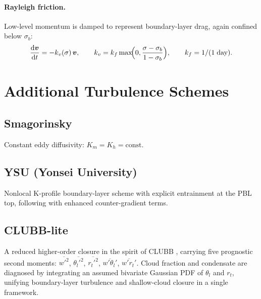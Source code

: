 \documentclass[11pt,twoside]{report}
\newcommand{\dd}{\mathrm{d}}
\newcommand{\vect}[1]{\bm{#1}}
\begin{document}
\paragraph{Rayleigh friction.}
Low-level momentum is damped to represent boundary-layer drag, again confined
below $\sigma_b$:
\begin{equation}
  \frac{\dd\vect{v}}{\dd t} = -k_v(\sigma)\,\vect{v},
  \qquad
  k_v = k_f\max\!\Bigl(0,\frac{\sigma-\sigma_b}{1-\sigma_b}\Bigr),
  \qquad k_f=1/(1\;\text{day}).
\end{equation}


\section{Additional Turbulence Schemes}

\subsection{Smagorinsky}
Constant eddy diffusivity: $K_m = K_h = \mathrm{const}$.

\subsection{YSU (Yonsei University)}
Nonlocal K-profile boundary-layer scheme with explicit entrainment at the PBL top, following \citet{HoltslagBoville1993} with enhanced counter-gradient terms.

\subsection{CLUBB-lite}
A reduced higher-order closure in the spirit of CLUBB \citep{Golaz2002},
carrying five prognostic second moments:
$\overline{w'^2}$, $\overline{\theta_l'^2}$, $\overline{r_t'^2}$,
$\overline{w'\theta_l'}$, $\overline{w'r_t'}$.
Cloud fraction and condensate are diagnosed by integrating an assumed
bivariate Gaussian PDF of $\theta_l$ and $r_t$, unifying boundary-layer
turbulence and shallow-cloud closure in a single framework.
\end{document}
